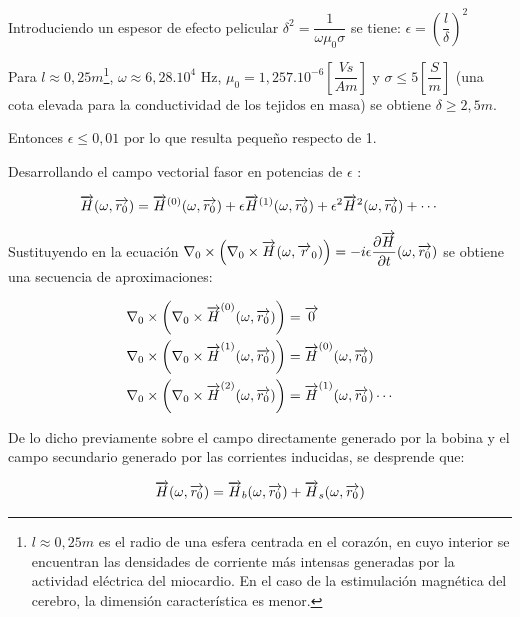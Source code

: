 Introduciendo un espesor de efecto pelicular $\delta^{2}=\dfrac{1}{\omega\mu_{0}\sigma}$ se tiene: $\epsilon=\left(\dfrac{l}{\delta} \right)^{2} $

Para $l\approx 0,25 m$\footnote{$l \approx 0,25 m$ es el radio de una esfera centrada en el corazón, en cuyo interior se encuentran las densidades de corriente más intensas generadas por la actividad eléctrica del miocardio. En el caso de la estimulación magnética del cerebro, la dimensión característica es menor.}, $\omega\approx 6,28.10^{4}$ Hz, $\mu_{0}=1,257.10^{−6}\left[ \dfrac{Vs}{Am} \right]$ y $\sigma \leq 5 \left[ \dfrac{S}{m}\right]$ (una cota elevada para la conductividad de los tejidos en masa) se obtiene $\delta\geq 2,5 m$.

Entonces $\epsilon \leq 0,01$ por lo que resulta pequeño respecto de 1.

Desarrollando el campo vectorial fasor en potencias de $\epsilon$ :

\begin{equation}
	\overrightarrow{H}(\omega,\overrightarrow{r_{0}})=\overrightarrow{H}^{(0)}(\omega,\overrightarrow{r_{0}})+\epsilon \overrightarrow{H}^{(1)}(\omega,\overrightarrow{r_{0}})+\epsilon^{2}\overrightarrow{H}^{2}(\omega,\overrightarrow{r_{0}})+ \cdots
\end{equation}

\begin{sloppypar}
Sustituyendo en la ecuación ${\nabla_{0} \times \left( \nabla_{0}\times\overrightarrow{H}_{}(\omega, \overrightarrow{r}_{0})\right) = - i\epsilon \dfrac{\partial \overrightarrow{H}}{\partial t}(\omega,\overrightarrow{r_{0}})}$ se obtiene una secuencia de aproximaciones:
\end{sloppypar}



\begin{equation}
\begin{aligned}
	&\nabla_{0} \times \left( \nabla_{0} \times {\overrightarrow{H}}^{(0)}(\omega ,\overrightarrow{r_{0}})\right)  = \overrightarrow{0}\\
	&\nabla_{0} \times \left( \nabla_{0} \times {\overrightarrow{H}}^{(1)}(\omega ,\overrightarrow{r_{0}})\right)  = {\overrightarrow{H}}^{(0)}(\omega ,\overrightarrow{r_{0}})\\
	&\nabla_{0} \times \left( \nabla_{0} \times {\overrightarrow{H}}^{(2)}(\omega ,\overrightarrow{r_{0}})\right)  = {\overrightarrow{H}}^{(1)}(\omega ,\overrightarrow{r_{0}})  \cdots    
\end{aligned}	
\end{equation}

De lo dicho previamente sobre el campo directamente generado por la bobina y el campo secundario generado por las corrientes inducidas, se desprende que:

\begin{equation}
	\overrightarrow{H}(\omega,\overrightarrow{r_{0}})=\overrightarrow{H}_{b}(\omega,\overrightarrow{r_{0}}) + \overrightarrow{H}_{s}(\omega,\overrightarrow{r_{0}})
\end{equation}


